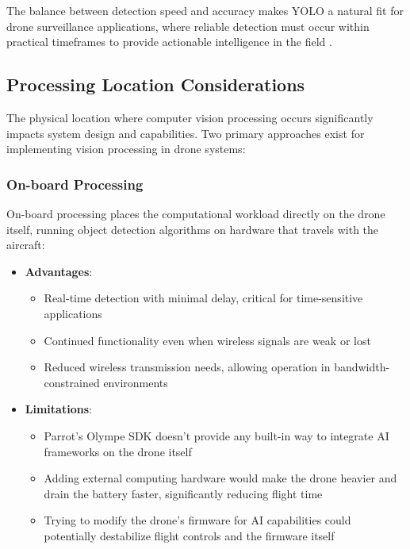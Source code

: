 The balance between detection speed and accuracy makes YOLO a natural fit for drone surveillance applications, where reliable detection must occur within practical timeframes to provide actionable intelligence in the field \cite{Kyrkou2019}.

\subsection{Processing Location Considerations}

The physical location where computer vision processing occurs significantly impacts system design and capabilities. Two primary approaches exist for implementing vision processing in drone systems:

\subsubsection{On-board Processing}

On-board processing places the computational workload directly on the drone itself, running object detection algorithms on hardware that travels with the aircraft:

\begin{itemize}
    \item \textbf{Advantages}:
    \begin{itemize}
        \item Real-time detection with minimal delay, critical for time-sensitive applications \cite{Tijtgat2017}
        \item Continued functionality even when wireless signals are weak or lost \cite{Mittal2019}
        \item Reduced wireless transmission needs, allowing operation in bandwidth-constrained environments \cite{Yanmaz2018}
    \end{itemize}
    
    \item \textbf{Limitations}:
    \begin{itemize}
        \item Parrot's Olympe SDK doesn't provide any built-in way to integrate AI frameworks on the drone itself \cite{ParrotOlympeDoc}
        \item Adding external computing hardware would make the drone heavier and drain the battery faster, significantly reducing flight time \cite{Mittal2019}
        \item Trying to modify the drone's firmware for AI capabilities could potentially destabilize flight controls and the firmware itself \cite{Tijtgat2017}
    \end{itemize}
\end{itemize}

